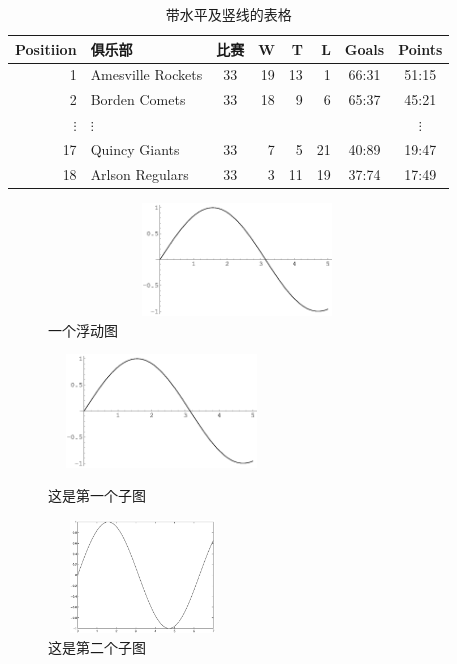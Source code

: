 \documentclass[a4paper,c5size,onecolumn,twoside,cap,Chinese]{APSart}
\begin{document}
\begin{table}[htbp]
\centering{}
{\caption{带水平及竖线的表格\label{table:1}}}
\vskip2mm
\begin{tabular}{r|l||c|rrr|c|c}
\hline
Positiion & 俱乐部 & 比赛 & W & T & L & Goals & Points \\ [0.5ex]
\hline\hline
1 & Amesville Rockets & 33 & 19 & 13 & 1 & 66:31& 51:15\\
2 & Borden Comets     & 33 & 18 & 9 & 6 &65:37 & 45:21\\ \hline
$\vdots$& $\vdots$    &&&&& &$\vdots$\\ \hline
17 & Quincy Giants    & 33 & 7 & 5 & 21 & 40:89 &19:47\\ \hline
18 & Arlson Regulars  & 33 & 3 & 11 &19 & 37:74 &17:49 \\ \hline
\end{tabular}
\end{table}

\begin{figure}[htbp]
\centering
\includegraphics[width=10cm,height=3cm]{figs/sin}
\caption{一个浮动图\label{fig:fig4}}
\end{figure}

\begin{figure}[htbp]
\begin{minipage}[t]{0.45\linewidth}
\centering
\includegraphics[width=6cm,height=3cm]{figs/sin}
\caption{这是第一个子图\label{fig:float2-1}}
\end{minipage}%
\hfill
\begin{minipage}[t]{0.5\linewidth}
\centering
\includegraphics[width=5cm,height=3cm]{figs/fig}
\caption{这是第二个子图\label{fig:float2-2}}
\end{minipage}
\end{figure}
\end{document}
